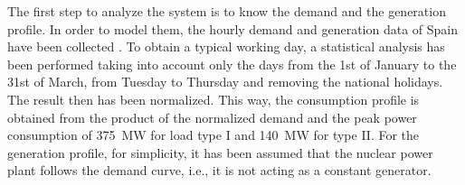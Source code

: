 The first step to analyze the system is to know the demand and the generation profile. In order to model them, the hourly demand and generation data of Spain have been collected \cite{esios}. To obtain a typical working day, a statistical analysis has been performed taking into account only the days from the 1st of January to the 31st of March, from Tuesday to Thursday and removing the national holidays. The result then has been normalized. This way, the consumption profile is obtained from the product of the normalized demand and the peak power consumption of 375~MW for load type I and 140~MW for type II. For the generation profile, for simplicity, it has been assumed that the nuclear power plant follows the demand curve, i.e., it is not acting as a constant generator.




